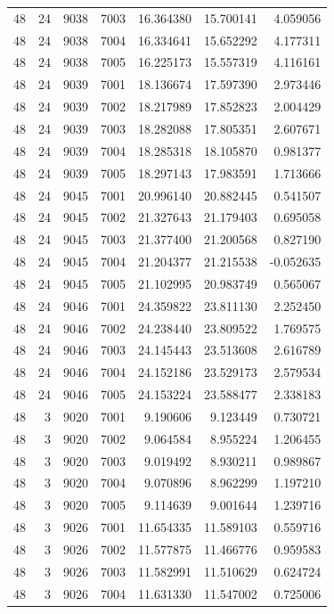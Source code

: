 \begin{table}
\begin{tabular}{rrrrrrr}
48 & 24 & 9038 & 7003 & 16.364380 & 15.700141 & 4.059056 \\
48 & 24 & 9038 & 7004 & 16.334641 & 15.652292 & 4.177311 \\
48 & 24 & 9038 & 7005 & 16.225173 & 15.557319 & 4.116161 \\
48 & 24 & 9039 & 7001 & 18.136674 & 17.597390 & 2.973446 \\
48 & 24 & 9039 & 7002 & 18.217989 & 17.852823 & 2.004429 \\
48 & 24 & 9039 & 7003 & 18.282088 & 17.805351 & 2.607671 \\
48 & 24 & 9039 & 7004 & 18.285318 & 18.105870 & 0.981377 \\
48 & 24 & 9039 & 7005 & 18.297143 & 17.983591 & 1.713666 \\
48 & 24 & 9045 & 7001 & 20.996140 & 20.882445 & 0.541507 \\
48 & 24 & 9045 & 7002 & 21.327643 & 21.179403 & 0.695058 \\
48 & 24 & 9045 & 7003 & 21.377400 & 21.200568 & 0.827190 \\
48 & 24 & 9045 & 7004 & 21.204377 & 21.215538 & -0.052635 \\
48 & 24 & 9045 & 7005 & 21.102995 & 20.983749 & 0.565067 \\
48 & 24 & 9046 & 7001 & 24.359822 & 23.811130 & 2.252450 \\
48 & 24 & 9046 & 7002 & 24.238440 & 23.809522 & 1.769575 \\
48 & 24 & 9046 & 7003 & 24.145443 & 23.513608 & 2.616789 \\
48 & 24 & 9046 & 7004 & 24.152186 & 23.529173 & 2.579534 \\
48 & 24 & 9046 & 7005 & 24.153224 & 23.588477 & 2.338183 \\
48 & 3 & 9020 & 7001 & 9.190606 & 9.123449 & 0.730721 \\
48 & 3 & 9020 & 7002 & 9.064584 & 8.955224 & 1.206455 \\
48 & 3 & 9020 & 7003 & 9.019492 & 8.930211 & 0.989867 \\
48 & 3 & 9020 & 7004 & 9.070896 & 8.962299 & 1.197210 \\
48 & 3 & 9020 & 7005 & 9.114639 & 9.001644 & 1.239716 \\
48 & 3 & 9026 & 7001 & 11.654335 & 11.589103 & 0.559716 \\
48 & 3 & 9026 & 7002 & 11.577875 & 11.466776 & 0.959583 \\
48 & 3 & 9026 & 7003 & 11.582991 & 11.510629 & 0.624724 \\
48 & 3 & 9026 & 7004 & 11.631330 & 11.547002 & 0.725006 \\

\end{tabular}
\end{table}
